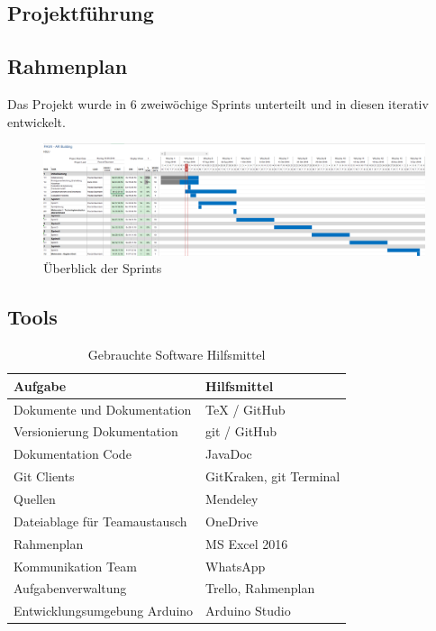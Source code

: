 \documentclass[a4paper]{scrreprt}
\begin{document}
\newpage
\subsection{Projektführung}

\subsection{Rahmenplan}

Das Projekt wurde in 6 zweiwöchige Sprints unterteilt und in diesen iterativ entwickelt.

\vspace{1em}

\begin{figure}[h!]
	\includegraphics[keepaspectratio, width=\textwidth]{Rahmenplan}
	\caption{Überblick der Sprints}
\end{figure}

\subsection{Tools}
\label{sec:Tools}
\begin{table}[h!]
	\begin{tabular}{|p{}|p{}|}
		\hline
		\textbf{Aufgabe} & \textbf{Hilfsmittel} \\
		\hline
		Dokumente und Dokumentation & TeX / GitHub \\
		\hline
		Versionierung Dokumentation & git / GitHub\\
		\hline
		Dokumentation Code & JavaDoc \\
		\hline
		Git Clients & GitKraken, git Terminal\\
		\hline
		Quellen & Mendeley \\
		\hline
		Dateiablage für Teamaustausch & OneDrive \\
		\hline
		Rahmenplan & MS Excel 2016 \\
		\hline
		Kommunikation Team & WhatsApp\\
		\hline
		Aufgabenverwaltung & Trello, Rahmenplan\\
		\hline
		Entwicklungsumgebung Arduino & Arduino Studio\\
		\hline
	\end{tabular}
	\caption{Gebrauchte Software Hilfsmittel}
	\label{tab:SWTools}
\end{table}
\end{document}
